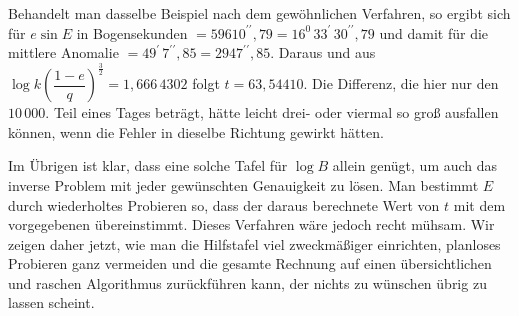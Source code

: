 \noindent Behandelt man dasselbe Beispiel nach dem gewöhnlichen Verfahren, so ergibt sich für $e\sin E$ in Bogensekunden $=59610^{\prime\prime}{,}79=16^0\,33^{\prime}\,30^{\prime\prime}{,}79$ und damit für die mittlere Anomalie $=49^{\prime}\,7^{\prime\prime}{,}85=2947^{\prime\prime}{,}85$. Daraus und aus $\log k\left(\dfrac{1-e}{q}\right)^{\frac{3}{2}}=1{,}666\,4302$ folgt $t=63{,}54410$. Die Differenz, die hier nur den $10\,000$. Teil eines Tages beträgt, hätte leicht drei- oder viermal so groß ausfallen können, wenn die Fehler in dieselbe Richtung gewirkt hätten.

Im Übrigen ist klar, dass eine solche Tafel für $\log B$ allein genügt, um auch das inverse Problem mit jeder gewünschten Genauigkeit zu lösen. Man bestimmt $E$ durch wiederholtes Probieren so, dass der daraus berechnete Wert von $t$ mit dem vorgegebenen übereinstimmt. Dieses Verfahren wäre jedoch recht mühsam. Wir zeigen daher jetzt, wie man die Hilfstafel viel zweckmäßiger einrichten, planloses Probieren ganz vermeiden und die gesamte Rechnung auf einen übersichtlichen und raschen Algorithmus zurückführen kann, der nichts zu wünschen übrig zu lassen scheint.
